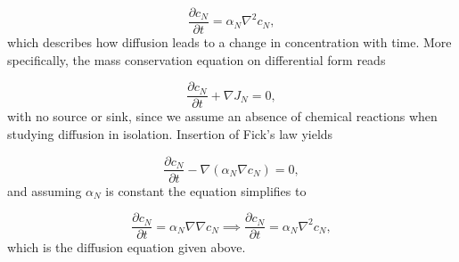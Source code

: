 \documentclass{article}
\begin{document}
\begin{equation}
    \frac{\partial c_N}{\partial t} = \alpha_N\nabla^2c_N, 
\end{equation}
which describes how diffusion leads to a change in concentration with time. More specifically, the mass conservation equation on differential form reads

\begin{equation*}
    \frac{\partial c_N}{\partial t} + \nabla J_N = 0,
\end{equation*}
with no source or sink, since we assume an absence of chemical reactions when studying diffusion in isolation. Insertion of Fick's law yields 

\begin{equation*}
    \frac{\partial c_N}{\partial t} - \nabla (\alpha_N\nabla c_N) = 0,
\end{equation*}
and assuming $\alpha_N$ is constant the equation simplifies to 

\begin{equation*}
    \frac{\partial c_N}{\partial t} = \alpha_N \nabla \nabla c_N \implies \frac{\partial c_N}{\partial t} = \alpha_N \nabla^2c_N,
\end{equation*}
which is the diffusion equation given above. 
\end{document}
